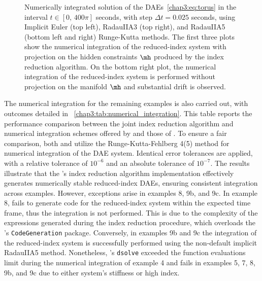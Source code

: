 \begin{figure}
  \centering
  \caption[
    Numerically integrated solution of the \acp{DAE}~\eqref{chap3:eq:torus} using Implicit Euler, RadauIIA3, and RadauIIA5 Runge-Kutta methods.
  ]{
    Numerically integrated solution of the \acp{DAE}~\eqref{chap3:eq:torus} in the interval $t \in [0, \, 400\pi]$ seconds, with step $\Delta t = 0.025$ seconds, using Implicit Euler (top left), RadauIIA3 (top right), and RadauIIA5 (bottom left and right) Runge-Kutta methods. The first three plots show the numerical integration of the reduced-index system with projection on the hidden constraints $\mh$ produced by the index reduction algorithm. On the bottom right plot, the numerical integration of the reduced-index system is performed without projection on the manifold $\mh$ and substantial drift is observed.
  }
  \label{chap3:fig:torus_integration}
\end{figure}

The numerical integration for the remaining examples is also carried out, with outcomes detailed in \tablename{}~\ref{chap3:tab:numerical_integration}. This table reports the performance comparison between the joint index reduction algorithm and numerical integration schemes offered by \Maple{} and those of \Indigo{}. To ensure a fair comparison, both \Maple{} and \Indigo{} utilize the Runge-Kutta-Fehlberg 4(5) method for numerical integration of the \ac{DAE} system. Identical error tolerances are applied, with a relative tolerance of $10^{-6}$ and an absolute tolerance of $10^{-7}$. The results illustrate that the \Indigo{}'s index reduction algorithm implementation effectively generates numerically stable reduced-index \acp{DAE}, ensuring consistent integration across examples. However, exceptions arise in examples 8, 9b, and 9c. In example 8, \Maple{} fails to generate code for the reduced-index system within the expected time frame, thus the integration is not performed. This is due to the complexity of the expressions generated during the index reduction procedure, which overloads the \Maple{}'s \texttt{CodeGeneration} package. Conversely, in examples 9b and 9c the integration of the reduced-index system is successfully performed using the non-default implicit RadauIIA5 method. Nonetheless, \Maple{}'s \texttt{dsolve} exceeded the function evaluations limit during the numerical integration of example 4 and fails in examples 5, 7, 8, 9b, and 9c due to either system's stiffness or high index.


